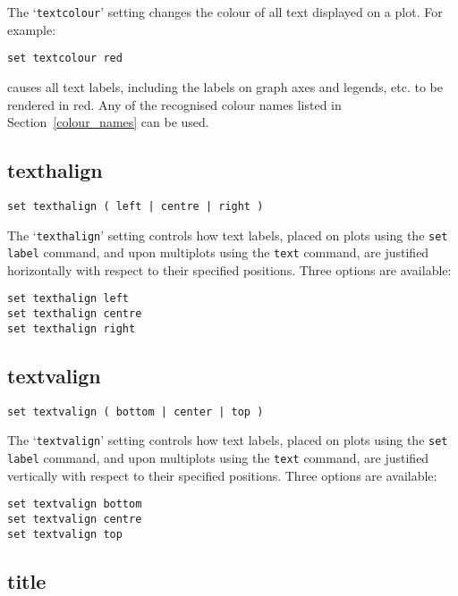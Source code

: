 The `{\tt textcolour}' setting changes the colour of all text displayed on a plot.
For example:

\begin{verbatim}
set textcolour red
\end{verbatim}

\noindent causes all text labels, including the labels on graph axes and
legends, etc. to be rendered in red. Any of the recognised colour names listed
in Section~\ref{colour_names} can be used.

\subsection{texthalign}

\begin{verbatim}
set texthalign ( left | centre | right )
\end{verbatim}

The `{\tt texthalign}' setting controls how text labels, placed on plots using the
{\tt set label} command, and upon multiplots using the {\tt text} command, are
justified horizontally with respect to their specified positions. Three options
are available:

\begin{verbatim}
set texthalign left
set texthalign centre
set texthalign right
\end{verbatim}

\subsection{textvalign}

\begin{verbatim}
set textvalign ( bottom | center | top )
\end{verbatim}

The `{\tt textvalign}' setting controls how text labels, placed on plots using the
{\tt set label} command, and upon multiplots using the {\tt text} command, are
justified vertically with respect to their specified positions. Three options
are available:

\begin{verbatim}
set textvalign bottom 
set textvalign centre
set textvalign top
\end{verbatim}

\subsection{title}


